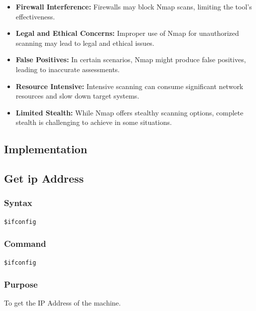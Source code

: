 \documentclass[11pt]{article}
\begin{document}
\begin{itemize}
    \item \textbf{Firewall Interference:} Firewalls may block Nmap scans, limiting the tool's effectiveness.
    \item \textbf{Legal and Ethical Concerns:} Improper use of Nmap for unauthorized scanning may lead to legal and ethical issues.
    \item \textbf{False Positives:} In certain scenarios, Nmap might produce false positives, leading to inaccurate assessments.
    \item \textbf{Resource Intensive:} Intensive scanning can consume significant network resources and slow down target systems.
    \item \textbf{Limited Stealth:} While Nmap offers stealthy scanning options, complete stealth is challenging to achieve in some situations.
\end{itemize}

\subsection{Implementation}

\subsection{Get ip Address}

\subsubsection*{Syntax}
\begin{verbatim}
$ifconfig
\end{verbatim}

\subsubsection*{Command}
\begin{verbatim}
$ifconfig
\end{verbatim}

\subsubsection*{Purpose}
To get the IP Address of the machine.
\end{document}

